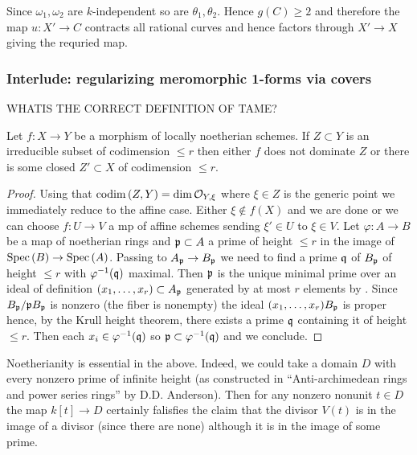 \documentclass[12pt]{article}
\begin{document}
Since $\omega_1, \omega_2$ are $k$-independent so are $\theta_1, \theta_2$. Hence $g(C) \ge 2$ and therefore the map $u : X' \to C$ contracts all rational curves and hence factors through $X' \to X$ giving the requried map. 

\subsubsection{Interlude: regularizing meromorphic 1-forms via covers}

{\color{red} WHATIS THE CORRECT DEFINITION OF TAME?}

\begin{lemma}
Let $f : X \to Y$ be a morphism of locally noetherian schemes. If $Z \subset Y$ is an irreducible subset of codimension $\le r$ then either $f$ does not dominate $Z$ or there is some closed $Z' \subset X$ of codimension $\le r$. 
\end{lemma}

\begin{proof}
Using that $\mathrm{codim}\left( Z,Y \right) = \dim{\mathcal{O}_{Y, \xi}}$ where $\xi \in Z$ is the generic point we immediately reduce to the affine case. Either $\xi \notin f(X)$ and we are done or we can choose $f : U \to V$ a mp of affine schemes sending $\xi' \in U$ to $\xi \in V$. Let $\varphi : A \to B$ be a map of noetherian rings and $\mathfrak{p} \subset A$ a prime of height $\le r$ in the image of $\mathrm{Spec}\left( B \right) \to \mathrm{Spec}\left( A \right)$. Passing to $A_{\mathfrak{p}} \to B_{\mathfrak{p}}$ we need to find a prime $\mathfrak{q}$ of $B_{\mathfrak{p}}$ of height $\le r$ with $\varphi^{-1}(\mathfrak{q})$ maximal. Then $\mathfrak{p}$ is the unique minimal prime over an ideal of definition $(x_1, \dots, x_r) \subset A_{\mathfrak{p}}$ generated by at most $r$ elements by . Since $B_{\mathfrak{p}} / \mathfrak{p} B_{\mathfrak{p}}$ is nonzero (the fiber is nonempty) the ideal $(x_1, \dots, x_r) B_{\mathfrak{p}}$ is proper hence, by the Krull height theorem, there exists a prime $\mathfrak{q}$ containing it of height $\le r$. Then each $x_i \in \varphi^{-1}(\mathfrak{q})$ so $\mathfrak{p} \subset \varphi^{-1}(\mathfrak{q})$ and we conclude. 
\end{proof}

\begin{example}
Noetherianity is essential in the above. Indeed, we could take a domain $D$ with every nonzero prime of infinite height (as constructed in ``Anti-archimedean rings and power series rings'' by D.D. Anderson). Then for any nonzero nonunit $t \in D$ the map $k[t] \to D$ certainly falisfies the claim that the divisor $V(t)$ is in the image of a divisor (since there are none) although it is in the image of some prime.
\end{example}
\end{document}
